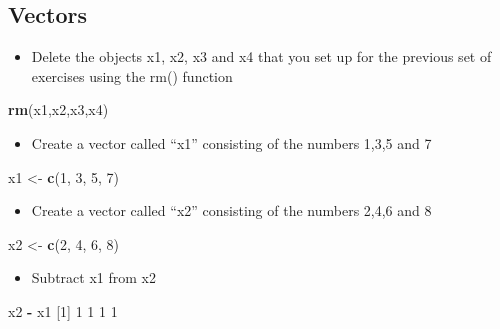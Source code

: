\documentclass[
]{book}
\newenvironment{Shaded}{\begin{snugshade}}{\end{snugshade}}
\newcommand{\DecValTok}[1]{\textcolor[rgb]{0.00,0.00,0.81}{#1}}
\newcommand{\KeywordTok}[1]{\textcolor[rgb]{0.13,0.29,0.53}{\textbf{#1}}}
\newcommand{\NormalTok}[1]{#1}
\newcommand{\OperatorTok}[1]{\textcolor[rgb]{0.81,0.36,0.00}{\textbf{#1}}}
\newcommand{\StringTok}[1]{\textcolor[rgb]{0.31,0.60,0.02}{#1}}
\providecommand{\tightlist}{%
  \setlength{\itemsep}{0pt}\setlength{\parskip}{0pt}}
\begin{document}
\hypertarget{vectors-2}{%
\subsection{Vectors}\label{vectors-2}}

\begin{itemize}
\tightlist
\item
  Delete the objects x1, x2, x3 and x4 that you set up for the previous set of exercises using the rm() function
\end{itemize}

\begin{Shaded}
\begin{Highlighting}[]
\KeywordTok{rm}\NormalTok{(x1,x2,x3,x4)     }
\end{Highlighting}
\end{Shaded}

\begin{itemize}
\tightlist
\item
  Create a vector called ``x1'' consisting of the numbers 1,3,5 and 7
\end{itemize}

\begin{Shaded}
\begin{Highlighting}[]
\NormalTok{x1 <-}\StringTok{ }\KeywordTok{c}\NormalTok{(}\DecValTok{1}\NormalTok{, }\DecValTok{3}\NormalTok{, }\DecValTok{5}\NormalTok{, }\DecValTok{7}\NormalTok{)}
\end{Highlighting}
\end{Shaded}

\begin{itemize}
\tightlist
\item
  Create a vector called ``x2'' consisting of the numbers 2,4,6 and 8
\end{itemize}

\begin{Shaded}
\begin{Highlighting}[]
\NormalTok{x2 <-}\StringTok{ }\KeywordTok{c}\NormalTok{(}\DecValTok{2}\NormalTok{, }\DecValTok{4}\NormalTok{, }\DecValTok{6}\NormalTok{, }\DecValTok{8}\NormalTok{)}
\end{Highlighting}
\end{Shaded}

\begin{itemize}
\tightlist
\item
  Subtract x1 from x2
\end{itemize}

\begin{Shaded}
\begin{Highlighting}[]
\NormalTok{x2 }\OperatorTok{-}\StringTok{ }\NormalTok{x1}
\NormalTok{[}\DecValTok{1}\NormalTok{] }\DecValTok{1} \DecValTok{1} \DecValTok{1} \DecValTok{1}
\end{Highlighting}
\end{Shaded}
\end{document}
